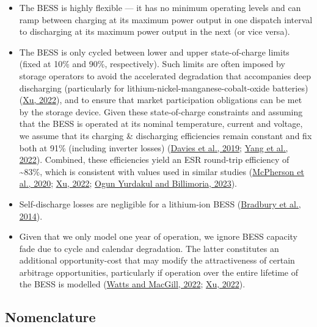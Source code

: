 \documentclass[12pt,a4paper,]{report}
\providecommand{\tightlist}{%
  \setlength{\itemsep}{0pt}\setlength{\parskip}{0pt}}
\begin{document}
\begin{itemize}
\tightlist
\item
  The BESS is highly flexible --- it has no minimum operating levels and
  can ramp between charging at its maximum power output in one dispatch
  interval to discharging at its maximum power output in the next (or
  vice versa).
\item
  The BESS is only cycled between lower and upper state-of-charge limits
  (fixed at 10\% and 90\%, respectively). Such limits are often imposed
  by storage operators to avoid the accelerated degradation that
  accompanies deep discharging (particularly for
  lithium-nickel-manganese-cobalt-oxide batteries)
  (\protect\hyperlink{ref-xuRoleModelingBattery2022}{Xu, 2022}), and to
  ensure that market participation obligations can be met by the storage
  device. Given these state-of-charge constraints and assuming that the
  BESS is operated at its nominal temperature, current and voltage, we
  assume that its charging \& discharging efficiencies remain constant
  and fix both at 91\% (including inverter losses)
  (\protect\hyperlink{ref-daviesCombinedEconomicTechnological2019}{Davies
  et al., 2019};
  \protect\hyperlink{ref-yangModellingOptimalEnergy2022}{Yang et al.,
  2022}). Combined, these efficiencies yield an ESR round-trip
  efficiency of \textasciitilde83\%, which is consistent with values
  used in similar studies
  (\protect\hyperlink{ref-mcphersonImpactsStorageDispatch2020}{McPherson
  et al., 2020}; \protect\hyperlink{ref-xuRoleModelingBattery2022}{Xu,
  2022};
  \protect\hyperlink{ref-yurdakulRiskAverseSelfSchedulingStorage2023}{Ogun
  Yurdakul and Billimoria, 2023}).
\item
  Self-discharge losses are negligible for a lithium-ion BESS
  (\protect\hyperlink{ref-bradburyEconomicViabilityEnergy2014}{Bradbury
  et al., 2014}).
\item
  Given that we only model one year of operation, we ignore BESS
  capacity fade due to cycle and calendar degradation. The latter
  constitutes an additional opportunity-cost that may modify the
  attractiveness of certain arbitrage opportunities, particularly if
  operation over the entire lifetime of the BESS is modelled
  (\protect\hyperlink{ref-wattsEffectsBatteryDegradation2022}{Watts and
  MacGill, 2022}; \protect\hyperlink{ref-xuRoleModelingBattery2022}{Xu,
  2022}).
\end{itemize}

\hypertarget{nomenclature}{%
\subsection{Nomenclature}\label{nomenclature}}
\end{document}
